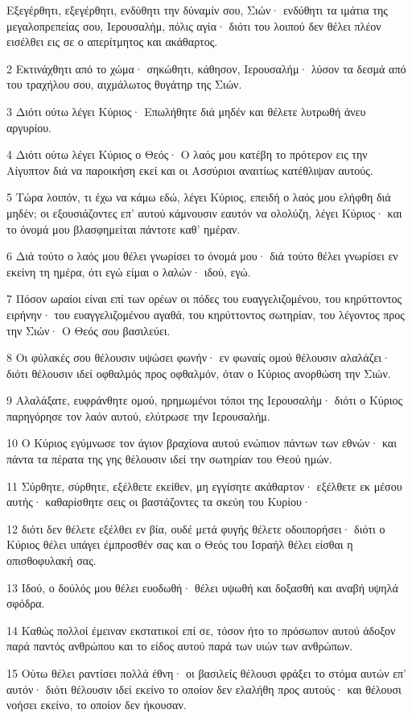 \par Εξεγέρθητι, εξεγέρθητι, ενδύθητι την δύναμίν σου, Σιών· ενδύθητι τα ιμάτια της μεγαλοπρεπείας σου, Ιερουσαλήμ, πόλις αγία· διότι του λοιπού δεν θέλει πλέον εισέλθει εις σε ο απερίτμητος και ακάθαρτος.
\par 2 Εκτινάχθητι από το χώμα· σηκώθητι, κάθησον, Ιερουσαλήμ· λύσον τα δεσμά από του τραχήλου σου, αιχμάλωτος θυγάτηρ της Σιών.
\par 3 Διότι ούτω λέγει Κύριος· Επωλήθητε διά μηδέν και θέλετε λυτρωθή άνευ αργυρίου.
\par 4 Διότι ούτω λέγει Κύριος ο Θεός· Ο λαός μου κατέβη το πρότερον εις την Αίγυπτον διά να παροικήση εκεί και οι Ασσύριοι αναιτίως κατέθλιψαν αυτούς.
\par 5 Τώρα λοιπόν, τι έχω να κάμω εδώ, λέγει Κύριος, επειδή ο λαός μου ελήφθη διά μηδέν; οι εξουσιάζοντες επ' αυτού κάμνουσιν εαυτόν να ολολύζη, λέγει Κύριος· και το όνομά μου βλασφημείται πάντοτε καθ' ημέραν.
\par 6 Διά τούτο ο λαός μου θέλει γνωρίσει το όνομά μου· διά τούτο θέλει γνωρίσει εν εκείνη τη ημέρα, ότι εγώ είμαι ο λαλών· ιδού, εγώ.
\par 7 Πόσον ωραίοι είναι επί των ορέων οι πόδες του ευαγγελιζομένου, του κηρύττοντος ειρήνην· του ευαγγελιζομένου αγαθά, του κηρύττοντος σωτηρίαν, του λέγοντος προς την Σιών· Ο Θεός σου βασιλεύει.
\par 8 Οι φύλακές σου θέλουσιν υψώσει φωνήν· εν φωναίς ομού θέλουσιν αλαλάζει· διότι θέλουσιν ιδεί οφθαλμός προς οφθαλμόν, όταν ο Κύριος ανορθώση την Σιών.
\par 9 Αλαλάξατε, ευφράνθητε ομού, ηρημωμένοι τόποι της Ιερουσαλήμ· διότι ο Κύριος παρηγόρησε τον λαόν αυτού, ελύτρωσε την Ιερουσαλήμ.
\par 10 Ο Κύριος εγύμνωσε τον άγιον βραχίονα αυτού ενώπιον πάντων των εθνών· και πάντα τα πέρατα της γης θέλουσιν ιδεί την σωτηρίαν του Θεού ημών.
\par 11 Σύρθητε, σύρθητε, εξέλθετε εκείθεν, μη εγγίσητε ακάθαρτον· εξέλθετε εκ μέσου αυτής· καθαρίσθητε σεις οι βαστάζοντες τα σκεύη του Κυρίου·
\par 12 διότι δεν θέλετε εξέλθει εν βία, ουδέ μετά φυγής θέλετε οδοιπορήσει· διότι ο Κύριος θέλει υπάγει έμπροσθέν σας και ο Θεός του Ισραήλ θέλει είσθαι η οπισθοφυλακή σας.
\par 13 Ιδού, ο δούλός μου θέλει ευοδωθή· θέλει υψωθή και δοξασθή και αναβή υψηλά σφόδρα.
\par 14 Καθώς πολλοί έμειναν εκστατικοί επί σε, τόσον ήτο το πρόσωπον αυτού άδοξον παρά παντός ανθρώπου και το είδος αυτού παρά των υιών των ανθρώπων.
\par 15 Ούτω θέλει ραντίσει πολλά έθνη· οι βασιλείς θέλουσι φράξει το στόμα αυτών επ' αυτόν· διότι θέλουσιν ιδεί εκείνο το οποίον δεν ελαλήθη προς αυτούς· και θέλουσι νοήσει εκείνο, το οποίον δεν ήκουσαν.

